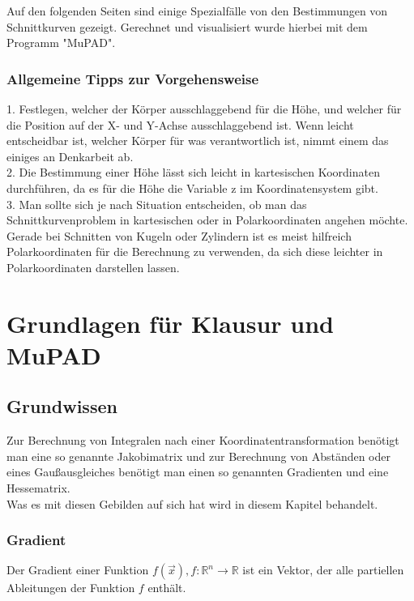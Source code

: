 \documentclass[11pt,final]{scrreprt}
\newcommand{\R} {\mathbb R}
\begin{document}
Auf den folgenden Seiten sind einige Spezialfälle von den Bestimmungen von Schnittkurven gezeigt. Gerechnet und visualisiert wurde hierbei mit dem Programm "MuPAD".

\subsection{Allgemeine Tipps zur Vorgehensweise}

1. Festlegen, welcher der Körper ausschlaggebend für die Höhe, und welcher für die Position auf der X- und Y-Achse ausschlaggebend ist. Wenn leicht entscheidbar ist, welcher Körper für was verantwortlich ist, nimmt einem das einiges an Denkarbeit ab.\\

2. Die Bestimmung einer Höhe lässt sich leicht in kartesischen Koordinaten durchführen, da es für die Höhe die Variable z im Koordinatensystem gibt.\\

3. Man sollte sich je nach Situation entscheiden, ob man das Schnittkurvenproblem in kartesischen oder in Polarkoordinaten angehen möchte. Gerade bei Schnitten von Kugeln oder Zylindern ist es meist hilfreich Polarkoordinaten für die Berechnung zu verwenden, da sich diese leichter in Polarkoordinaten darstellen lassen.\\



\chapter{Grundlagen für Klausur und MuPAD}

\section{Grundwissen}
Zur Berechnung von Integralen nach einer Koordinatentransformation benötigt man eine so genannte Jakobimatrix und zur Berechnung von Abständen oder eines Gaußausgleiches benötigt man einen so genannten Gradienten und eine Hessematrix.\\
Was es mit diesen Gebilden auf sich hat wird in diesem Kapitel behandelt.\\

\subsection{Gradient}
Der Gradient einer Funktion $f(\overrightarrow{x}), f:\R^n \rightarrow \R$ ist ein Vektor, der alle partiellen Ableitungen der Funktion $f$ enthält.\\
\end{document}
